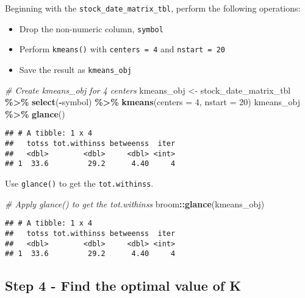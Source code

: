 \documentclass[
]{article}
\newenvironment{Shaded}{\begin{snugshade}}{\end{snugshade}}
\newcommand{\AttributeTok}[1]{\textcolor[rgb]{0.13,0.29,0.53}{#1}}
\newcommand{\CommentTok}[1]{\textcolor[rgb]{0.56,0.35,0.01}{\textit{#1}}}
\newcommand{\DecValTok}[1]{\textcolor[rgb]{0.00,0.00,0.81}{#1}}
\newcommand{\FunctionTok}[1]{\textcolor[rgb]{0.13,0.29,0.53}{\textbf{#1}}}
\newcommand{\NormalTok}[1]{#1}
\newcommand{\OtherTok}[1]{\textcolor[rgb]{0.56,0.35,0.01}{#1}}
\newcommand{\SpecialCharTok}[1]{\textcolor[rgb]{0.81,0.36,0.00}{\textbf{#1}}}
\providecommand{\tightlist}{%
  \setlength{\itemsep}{0pt}\setlength{\parskip}{0pt}}
\begin{document}
Beginning with the \texttt{stock\_date\_matrix\_tbl}, perform the
following operations:

\begin{itemize}
\tightlist
\item
  Drop the non-numeric column, \texttt{symbol}
\item
  Perform \texttt{kmeans()} with \texttt{centers\ =\ 4} and
  \texttt{nstart\ =\ 20}
\item
  Save the result as \texttt{kmeans\_obj}
\end{itemize}

\begin{Shaded}
\begin{Highlighting}[]
\CommentTok{\# Create kmeans\_obj for 4 centers}
\NormalTok{kmeans\_obj }\OtherTok{\textless{}{-}}\NormalTok{ stock\_date\_matrix\_tbl }\SpecialCharTok{\%\textgreater{}\%} 
    \FunctionTok{select}\NormalTok{(}\SpecialCharTok{{-}}\NormalTok{symbol) }\SpecialCharTok{\%\textgreater{}\%} 
    \FunctionTok{kmeans}\NormalTok{(}\AttributeTok{centers =} \DecValTok{4}\NormalTok{, }\AttributeTok{nstart =} \DecValTok{20}\NormalTok{)}
\NormalTok{kmeans\_obj }\SpecialCharTok{\%\textgreater{}\%} \FunctionTok{glance}\NormalTok{()}
\end{Highlighting}
\end{Shaded}

\begin{verbatim}
## # A tibble: 1 x 4
##   totss tot.withinss betweenss  iter
##   <dbl>        <dbl>     <dbl> <int>
## 1  33.6         29.2      4.40     4
\end{verbatim}

Use \texttt{glance()} to get the \texttt{tot.withinss}.

\begin{Shaded}
\begin{Highlighting}[]
\CommentTok{\# Apply glance() to get the tot.withinss}
\NormalTok{broom}\SpecialCharTok{::}\FunctionTok{glance}\NormalTok{(kmeans\_obj)}
\end{Highlighting}
\end{Shaded}

\begin{verbatim}
## # A tibble: 1 x 4
##   totss tot.withinss betweenss  iter
##   <dbl>        <dbl>     <dbl> <int>
## 1  33.6         29.2      4.40     4
\end{verbatim}

\hypertarget{step-4---find-the-optimal-value-of-k}{%
\subsection{Step 4 - Find the optimal value of
K}\label{step-4---find-the-optimal-value-of-k}}
\end{document}
